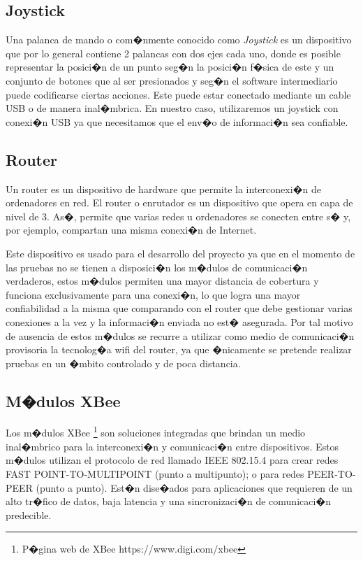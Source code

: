 	\subsection{Joystick}	

		Una palanca de mando o com�nmente conocido como \textit{Joystick}  es un dispositivo que por lo general contiene 2 palancas con dos ejes cada uno, donde es posible representar la posici�n de un punto seg�n la posici�n f�sica de este y un conjunto de botones que al ser presionados y seg�n el software intermediario puede codificarse ciertas acciones. Este puede estar conectado mediante un cable USB o de manera inal�mbrica. En nuestro caso, utilizaremos un joystick con conexi�n USB ya que necesitamos que el env�o de informaci�n sea confiable.

	\subsection{Router}
	
		Un router es un dispositivo de hardware que permite la interconexi�n de ordenadores en red. El router o enrutador es un dispositivo que opera en capa de nivel de 3. As�, permite que varias redes u ordenadores se conecten entre s� y, por ejemplo, compartan una misma conexi�n de Internet. 
		\par Este dispositivo es usado para el desarrollo del proyecto ya que en el momento de las pruebas no se tienen a disposici�n los m�dulos de comunicaci�n verdaderos, estos m�dulos permiten una mayor distancia de cobertura y funciona exclusivamente para una conexi�n, lo que logra una mayor confiabilidad a la misma que comparando con el router que debe gestionar varias conexiones a la vez y la informaci�n enviada no est� asegurada. Por tal motivo de ausencia de estos m�dulos se recurre a utilizar como medio de comunicaci�n provisoria la tecnolog�a wifi del router, ya que �nicamente se pretende realizar pruebas en un �mbito controlado y de poca distancia.
	

	\subsection{M�dulos XBee}
	
		Los m�dulos XBee \footnote{P�gina web de XBee  https://www.digi.com/xbee} son soluciones integradas que brindan un medio inal�mbrico para la interconexi�n y comunicaci�n entre dispositivos. Estos m�dulos utilizan el protocolo de red llamado IEEE 802.15.4 para crear redes FAST POINT-TO-MULTIPOINT (punto a multipunto); o para redes PEER-TO-PEER (punto a punto). Est�n dise�ados para aplicaciones que requieren de un alto tr�fico de datos, baja latencia y una sincronizaci�n de comunicaci�n predecible.
	
